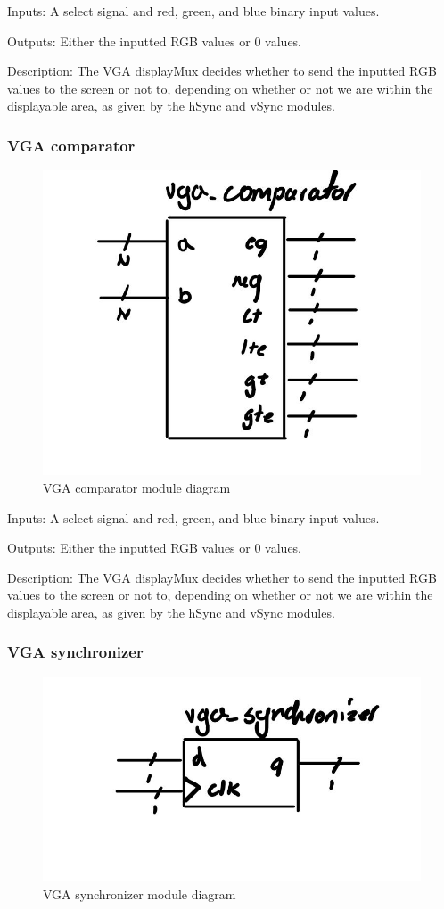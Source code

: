 \documentclass[a4paper]{article}
\begin{document}
Inputs: A select signal and red, green, and blue binary input values.

Outputs: Either the inputted RGB values or 0 values.

Description: The VGA displayMux decides whether to send the inputted RGB values to the screen or not to, depending on whether or not we are within the displayable area, as given by the hSync and vSync modules.

\subsubsection{VGA comparator}

\begin{figure}[H]
    \includegraphics[width=0.8 \linewidth]{images/vgacomparator.JPG}
    \caption{VGA comparator module diagram}
    \label{vgaComparatorDiagram}
\end{figure}

Inputs: A select signal and red, green, and blue binary input values.

Outputs: Either the inputted RGB values or 0 values.

Description: The VGA displayMux decides whether to send the inputted RGB values to the screen or not to, depending on whether or not we are within the displayable area, as given by the hSync and vSync modules.

\subsubsection{VGA synchronizer}

\begin{figure}[H]
    \includegraphics[width=0.8 \linewidth]{images/vgasynchronizer.JPG}
    \caption{VGA synchronizer module diagram}
    \label{vgaSynchronizerDiagram}
\end{figure}
\end{document}
